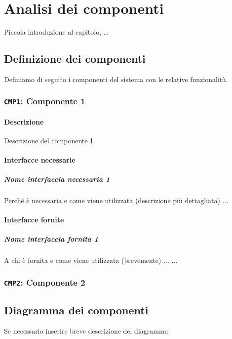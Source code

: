 \chapter{Analisi dei componenti}

Piccola introduzione al capitolo, \dots

\section{Definizione dei componenti}
    Definiamo di seguito i componenti del sistema con le relative funzionalità.
    
    \subsection{\texttt{CMP1}: Componente 1}
        \subsubsection{Descrizione} 
            Descrizione del componente 1.
        \subsubsection{Interfacce necessarie}
            \paragraph{Nome interfaccia necessaria 1} Perché è necessaria e come viene utilizzata (descrizione più dettagliata)
            ...
        \subsubsection{Interfacce fornite}
            \paragraph{Nome interfaccia fornita 1} A chi è fornita e come viene utilizzata (brevemente)
            ...
    ...


    \subsection{\texttt{CMP2}: Componente 2}

\section{Diagramma dei componenti}
    Se necessario inserire breve descrizione del diagramma.

